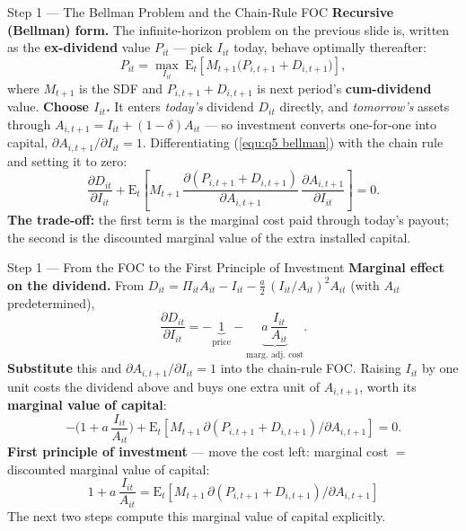 \documentclass{beamer}
\begin{document}
\begin{frame}{Step 1 --- The Bellman Problem and the Chain-Rule FOC}
	\textbf{Recursive (Bellman) form.} The infinite-horizon problem on the previous slide is, written as the \textbf{ex-dividend} value $P_{it}$ --- pick $I_{it}$ today, behave optimally thereafter:
	\begin{equation}\label{equ:q5 bellman}
		P_{it}=\max_{I_{it}}\ \mathrm{E}_t\!\left[M_{t+1}\big(P_{i,t+1}+D_{i,t+1}\big)\right],
	\end{equation}
	where $M_{t+1}$ is the SDF and $P_{i,t+1}+D_{i,t+1}$ is next period's \textbf{cum-dividend} value.
	\vspace{2pt}
	\textbf{Choose $I_{it}$.} It enters \emph{today's} dividend $D_{it}$ directly, and \emph{tomorrow's} assets through $A_{i,t+1}=I_{it}+(1-\delta)A_{it}$ --- so investment converts one-for-one into capital, $\partial A_{i,t+1}/\partial I_{it}=1$. Differentiating (\ref{equ:q5 bellman}) with the chain rule and setting it to zero:
	\[
		\frac{\partial D_{it}}{\partial I_{it}}+\mathrm{E}_t\!\left[M_{t+1}\,\frac{\partial (P_{i,t+1}+D_{i,t+1})}{\partial A_{i,t+1}}\,\frac{\partial A_{i,t+1}}{\partial I_{it}}\right]=0.
	\]
	\textbf{The trade-off:} the first term is the marginal cost paid through today's payout; the second is the discounted marginal value of the extra installed capital.
\end{frame}

\begin{frame}{Step 1 --- From the FOC to the First Principle of Investment}
	\textbf{Marginal effect on the dividend.} From $D_{it}=\Pi_{it}A_{it}-I_{it}-\frac{a}{2}\,(I_{it}/A_{it})^{2}A_{it}$ (with $A_{it}$ predetermined),
	\[
		\frac{\partial D_{it}}{\partial I_{it}}=-\underbrace{1}_{\text{price}}-\underbrace{a\,\frac{I_{it}}{A_{it}}}_{\text{marg.\ adj.\ cost}}.
	\]
	\textbf{Substitute} this and $\partial A_{i,t+1}/\partial I_{it}=1$ into the chain-rule FOC. Raising $I_{it}$ by one unit costs the dividend above and buys one extra unit of $A_{i,t+1}$, worth its \textbf{marginal value of capital}:
	\[
		-\Big(1+a\,\frac{I_{it}}{A_{it}}\Big)+\mathrm{E}_t\!\left[M_{t+1}\,\partial (P_{i,t+1}{+}D_{i,t+1})/\partial A_{i,t+1}\right]=0.
	\]
	\textbf{First principle of investment} --- move the cost left: marginal cost $=$ discounted marginal value of capital:
	\begin{equation}\label{equ:q5 foc}
		\boxed{\;1+a\,\frac{I_{it}}{A_{it}}=\mathrm{E}_t\!\left[M_{t+1}\,\partial (P_{i,t+1}{+}D_{i,t+1})/\partial A_{i,t+1}\right]\;}
	\end{equation}
	The next two steps compute this marginal value of capital explicitly.
\end{frame}
\end{document}
